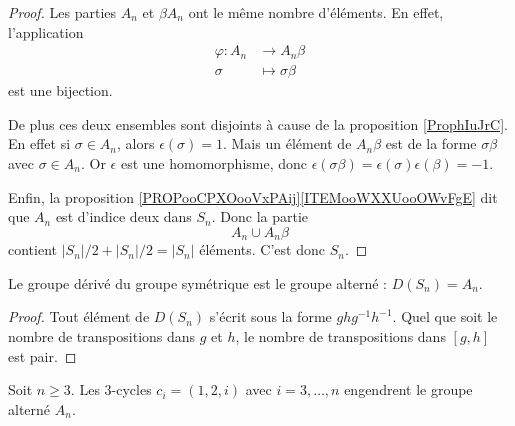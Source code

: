 \begin{proof}
    Les parties \( A_n\) et \( \beta A_n\) ont le même nombre d'éléments. En effet, l'application
    \begin{equation}
        \begin{aligned}
            \varphi\colon A_n&\to A_n\beta \\
            \sigma&\mapsto \sigma\beta 
        \end{aligned}
    \end{equation}
    est une bijection.

    De plus ces deux ensembles sont disjoints à cause de la proposition \ref{ProphIuJrC}. En effet si \( \sigma\in A_n\), alors \( \epsilon(\sigma)=1\). Mais un élément de \( A_n\beta\) est de la forme \( \sigma\beta\) avec \( \sigma\in A_n\). Or \( \epsilon\) est une homomorphisme, donc \( \epsilon(\sigma\beta)=\epsilon(\sigma)\epsilon(\beta)=-1\).

    Enfin, la proposition \ref{PROPooCPXOooVxPAij}\ref{ITEMooWXXUooOWvFgE} dit que \( A_n\) est d'indice deux dans \( S_n\). Donc la partie
    \begin{equation}
        A_n\cup A_n\beta
    \end{equation}
    contient \( | S_n |/2+| S_n |/2=| S_n |\) éléments. C'est donc \( S_n\).
\end{proof}

\begin{lemma}   \label{LemiApyfp}   
    Le groupe dérivé du groupe symétrique est le groupe alterné : \( D(S_n)=A_n\).
\end{lemma}

\begin{proof}
    Tout élément de \( D(S_n)\) s'écrit sous la forme \( ghg^{-1}h^{-1}\). Quel que soit le nombre de transpositions dans \( g\) et \( h\), le nombre de transpositions dans \( [g,h]\) est pair.
\end{proof}

\begin{proposition}     \label{PropsHlmvv}
    Soit \( n\geq 3\). Les \( 3\)-cycles \( c_i=(1,2,i)\) avec \( i=3,\ldots, n\) engendrent le groupe alterné \( A_n\).
\end{proposition}

